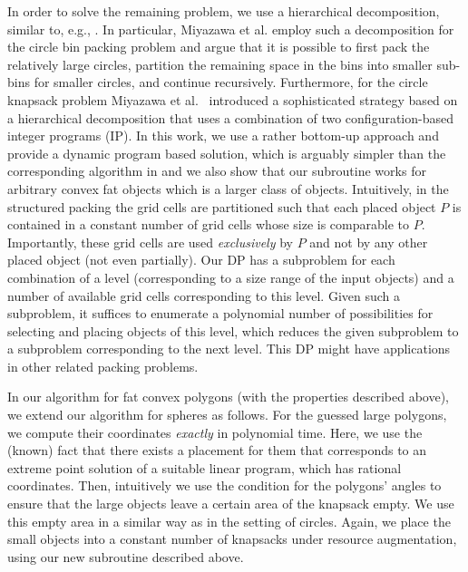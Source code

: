 \documentclass[10pt,a4paper]{article}
\theoremstyle{plain}
\theoremstyle{plain}
\theoremstyle{plain}
\theoremstyle{definition}
\begin{document}
{In order to solve the remaining problem, we use a hierarchical decomposition,
similar to, e.g., \cite{ErlebachJS05, JansenS08, MiyazawaPSSW16, MiyazawaWAOA}. In particular, Miyazawa et al. \cite{MiyazawaPSSW16} employ such a decomposition for the circle bin packing problem and argue that it is possible to first pack the relatively large circles, partition the remaining space in the bins into smaller sub-bins for smaller circles, and continue recursively.
Furthermore, for the circle knapsack problem
Miyazawa et al.~\cite{MiyazawaWAOA} introduced a sophisticated strategy based on a hierarchical decomposition that uses a combination of two configuration-based integer programs (IP). 
In this work, we use a rather bottom-up approach and provide a dynamic program based solution, which is arguably simpler than the corresponding algorithm in \cite{MiyazawaWAOA} and we also show that our subroutine works for arbitrary convex fat objects which is a larger class of objects.
Intuitively, in the structured packing the grid cells are
partitioned such that each placed object $P$ is contained in a constant number of grid cells
whose size is comparable to $P$. Importantly, these grid cells are used \emph{exclusively} by $P$
and not by any other placed object (not even partially). 
Our DP has a subproblem
for each combination of a level (corresponding to a size range of the input objects) and a number of
available grid cells corresponding to this level.
Given such a subproblem, it suffices to enumerate a polynomial number of possibilities for selecting and placing
objects of this level, which reduces the given subproblem
to a subproblem corresponding to the next level. This DP might have applications in other related packing problems. 


In our algorithm for fat convex polygons (with the properties described
above), we extend our algorithm for spheres as follows. For the
guessed large polygons, we compute their coordinates \emph{exactly
}in polynomial time. Here, we use the (known) fact that there exists
a placement for them that corresponds to an extreme point solution
of a suitable linear program, which has rational coordinates. Then,
intuitively we use the condition for the polygons' angles to ensure
that the large objects leave a certain area of the knapsack empty.
We use this empty area in a similar way as in the setting of circles.
Again, we place the small objects into a constant number of knapsacks
under resource augmentation, using our new subroutine described above.


}
\end{document}
